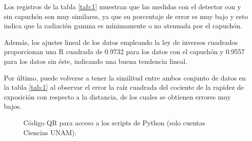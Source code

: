 \begin{multicols}{2}
  Los registros de la tabla \ref{tab:1} muestran que las medidas con el detector con y sin capuchón son muy similares, ya que su porcentaje de error es muy bajo y esto indica que la radiación gamma es mínimamente o no atenuada por el capuchón. 
  
  Además, los ajustes lineal de los datos empleando la ley de inversos cuadrados proporcionan una R cuadrada de 0.9732 para los datos con el capuchón y 0.9557 para los datos sin éste, indicando una buena tendencia lineal. 

  Por último, puede volverse a tener la similitud entre ambos conjunto de datos en la tabla \ref{tab:1} al observar el error la raíz cuadrada del cociente de la rapidez de exposición con respecto a la distancia, de los cuales se obtienen errores muy bajos.

 \bigskip\bigskip\bigskip\bigskip
 \bigskip
 \bigskip
 \bigskip


\small{
}


\begin{figure}[H]
  \centering
  \caption{Código QR para acceso a los scripts de Python (solo cuentas Ciencias UNAM).}
  \label{fig:QR}
\end{figure}





\end{multicols}








